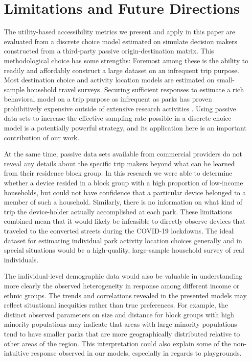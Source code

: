 \documentclass[3p, authoryear, review]{elsarticle} %
\begin{document}
\hypertarget{limitations}{%
\section{Limitations and Future Directions}\label{limitations}}

The utility-based accessibility metrics we present and apply in this paper are
evaluated from a discrete choice model estimated on simulate decision makers
constructed from a third-party passive origin-destination matrix. This methodological
choice has some strengths: Foremost among these is the ability to readily and
affordably construct a large dataset on an infrequent trip purpose.
Most destination choice and activity location models are estimated on
small-sample household travel surveys. Securing sufficient responses to estimate
a rich behavioral model on a trip purpose as infrequent as parks has proven
prohibitively expensive outside of extensive research activities
\citep[e.g.,][]{Kaczynski2016}. Using passive data sets to increase the effective
sampling rate possible in a discrete choice model is a potentially powerful strategy,
and its application here is an important contribution of our work.

At the same time, passive data sets available from commercial providers do not
reveal any details about the specific trip makers beyond what can be learned
from their residence block group. In this research we were able to determine
whether a device resided in a block group with a high proportion of low-income
households, but could not have confidence that a particular device belonged
to a member of such a household. Similarly, there is no information on what kind
of trip the device-holder actually accomplished at each park. These limitations
combined mean that it would likely be infeasible to directly observe devices
that traveled to the converted streets during the COVID-19 lockdowns.
The ideal dataset for estimating individual park activity location choices generally
and in special situations would be a high-quality, large-sample household
survey of real individuals.

The individual-level demographic data would also be valuable in understanding
more clearly the observed heterogeneity in response among different income or
ethnic groups. The trends and correlations revealed in the
presented models may reflect situational inequities rather than true
preferences. For example, the distinct observed parameters on size and distance
for block groups with high minority populations may indicate that areas with
large minority populations tend to have smaller parks that are more
geographically distributed relative to other areas of the region. This
interpretation could also explain some of the non-intuitive response observed in
our models, especially in regards to playgrounds.
\end{document}
